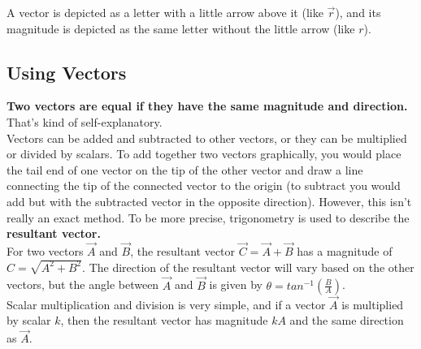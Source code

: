 \documentclass[12pt,letterpaper]{article}
\begin{document}
A vector is depicted as a letter with a little arrow above it (like $\vec{r}$), and its magnitude is depicted as the same letter without the little arrow (like $r$). \\

\subsection[Using Vectors]{Using Vectors}

\textbf{Two vectors are equal if they have the same magnitude and direction.} That's kind of self-explanatory. \\

Vectors can be added and subtracted to other vectors, or they can be multiplied or divided by scalars. To add together two vectors graphically, you would place the tail end of one vector on the tip of the other vector and draw a line connecting the tip of the connected vector to the origin (to subtract you would add but with the subtracted vector in the opposite direction). However, this isn't really an exact method. To be more precise, trigonometry is used to describe the \textbf{resultant vector.} \\

For two vectors $\vec{A}$ and $\vec{B}$, the resultant vector $\vec{C} = \vec{A} + \vec{B}$ has a magnitude of $C = \sqrt{A^{2} + B^{2}}$. The direction of the resultant vector will vary based on the other vectors, but the angle between $\vec{A}$ and $\vec{B}$ is given by $\theta = tan^{-1}(\frac{B}{A})$. \\

Scalar multiplication and division is very simple, and if a vector $\vec{A}$ is multiplied by scalar $k$, then the resultant vector has magnitude $kA$ and the same direction as $\vec{A}$.
\end{document}
